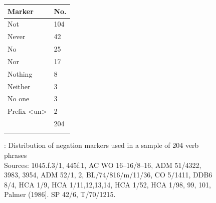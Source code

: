   
\begin{figure}

\begin{tabular}{ll}
\lsptoprule
Marker & No.\\
\midrule 
Not & 104\\
Never&42\\
No&25\\
Nor& 17\\
Nothing&8\\
Neither&3\\
No one&3\\
Prefix <un> & 2\\
\midrule
& 204\\
\lspbottomrule
\end{tabular}



 
\caption{\label{fig:key:6.1}: Distribution of negation markers used in a sample of 204 verb phrases\\
{\tiny Sources: 1045.f.3/1, 445f.1, AC WO 16–16/8–16, ADM 51/4322, 3983, 3954, ADM 52/1, 2, BL/74/816/m/11/36, CO 5/1411, DDB6 8/4, HCA 1/9, HCA 1/11,12,13,14, HCA 1/52, HCA 1/98, 99, 101, Palmer (1986]. SP 42/6, T/70/1215.}
}
\end{figure}


